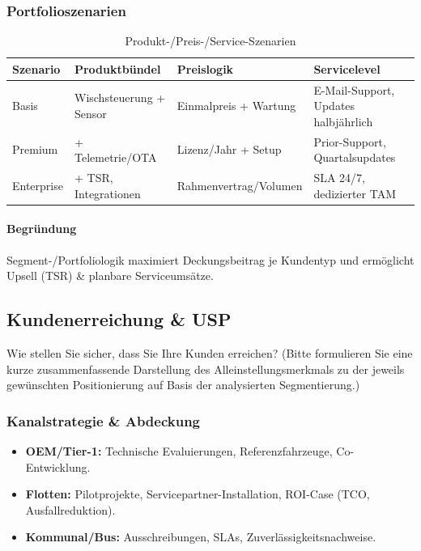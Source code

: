\documentclass[
%
ngerman %
%
numeric %
]{wbh-assignment}
\begin{document}
\subsubsection{Portfolioszenarien}
\begin{table}[htb!]
\centering
\caption{Produkt-/Preis-/Service-Szenarien}
\begin{tabular}{l l l l}
\textbf{Szenario} & \textbf{Produktbündel} & \textbf{Preislogik} & \textbf{Servicelevel} \\
\hline
Basis & Wischsteuerung + Sensor & Einmalpreis + Wartung & E-Mail-Support, Updates halbjährlich \\
Premium & + Telemetrie/OTA & Lizenz/Jahr + Setup & Prior-Support, Quartalsupdates \\
Enterprise & + TSR, Integrationen & Rahmenvertrag/Volumen & SLA 24/7, dedizierter TAM \\
\end{tabular}
\end{table}

\paragraph{Begründung}
Segment-/Portfoliologik maximiert Deckungsbeitrag je Kundentyp und ermöglicht Upsell (TSR) \& planbare Serviceumsätze.

\bigskip

\subsection{Kundenerreichung \& USP}
\begin{aufgabenstellung}
Wie stellen Sie sicher, dass Sie Ihre Kunden erreichen? (Bitte formulieren Sie eine kurze zusammenfassende Darstellung des Alleinstellungsmerkmals zu der jeweils gewünschten Positionierung auf Basis der analysierten Segmentierung.)
\end{aufgabenstellung}

\vspace*{5mm}

\subsubsection{Kanalstrategie \& Abdeckung}
\begin{itemize}
  \item \textbf{OEM/Tier-1:} Technische Evaluierungen, Referenzfahrzeuge, Co-Entwicklung.
  \item \textbf{Flotten:} Pilotprojekte, Servicepartner-Installation, ROI-Case (TCO, Ausfallreduktion).
  \item \textbf{Kommunal/Bus:} Ausschreibungen, SLAs, Zuverlässigkeitsnachweise.
\end{itemize}
\end{document}
